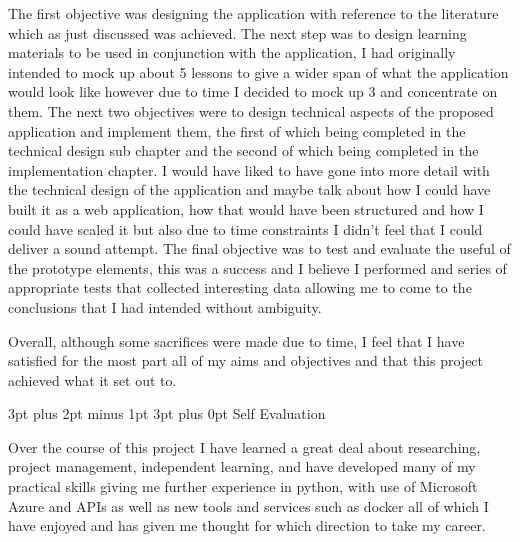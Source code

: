 \documentclass[12pt,a4paper]{article}
\makeatletter
\renewcommand\subsection{\@startsection {subsection}{1}{2mm} %
                               {3pt plus 2pt minus 1pt} %
                               {3pt plus 0pt} %
                               {\normalfont\bfseries}}
\makeatother
\begin{document}
The first objective was designing the application with reference to the literature which as just discussed was achieved. The next step was to design learning materials to be used in conjunction with the application, I had originally intended to mock up about 5 lessons to give a wider span of what the application would look like however due to time I decided to mock up 3 and concentrate on them. The next two objectives were to design technical aspects of the proposed application and implement them, the first of which being completed in the technical design sub chapter and the second of which being completed in the implementation chapter. I would have liked to have gone into more detail with the technical design of the application and maybe talk about how I could have built it as a web application, how that would have been structured and how I could have scaled it but also due to time constraints I didn't feel that I could deliver a sound attempt. The final objective was to test and evaluate the useful of the prototype elements, this was a success and I believe I performed and series of appropriate tests that collected interesting data allowing me to come to the conclusions that I had intended without ambiguity.  

Overall, although some sacrifices were made due to time, I feel that I have satisfied for the most part all of my aims and objectives and that this project achieved what it set out to.


\subsection{Self Evaluation}  

Over the course of this project I have learned a great deal about researching, project management, independent learning, and have developed many of my practical skills giving me further experience in python, with use of Microsoft Azure and APIs as well as new tools and services such as docker all of which I have enjoyed and has given me thought for which direction to take my career. 
\end{document}
